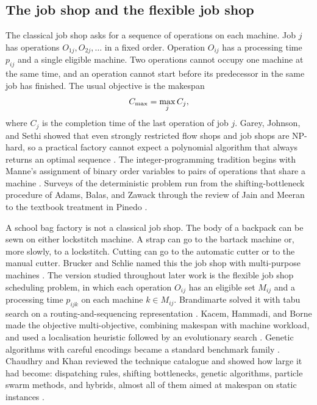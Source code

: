 \subsection{The job shop and the flexible job shop}

The classical job shop asks for a sequence of operations on each machine. Job \(j\) has operations \(O_{1j}, O_{2j}, \ldots\) in a fixed order. Operation \(O_{ij}\) has a processing time \(p_{ij}\) and a single eligible machine. Two operations cannot occupy one machine at the same time, and an operation cannot start before its predecessor in the same job has finished. The usual objective is the makespan
\begin{equation}
C_{\max} = \max_j C_j,
\label{eq:cmax-classic}
\end{equation}
where \(C_j\) is the completion time of the last operation of job \(j\). Garey, Johnson, and Sethi showed that even strongly restricted flow shops and job shops are NP-hard, so a practical factory cannot expect a polynomial algorithm that always returns an optimal sequence \cite{garey1976}. The integer-programming tradition begins with Manne's assignment of binary order variables to pairs of operations that share a machine \cite{manne1960}. Surveys of the deterministic problem run from the shifting-bottleneck procedure of Adams, Balas, and Zawack \cite{adams1988} through the review of Jain and Meeran \cite{jain1999} to the textbook treatment in Pinedo \cite{pinedo2016}.

A school bag factory is not a classical job shop. The body of a backpack can be sewn on either lockstitch machine. A strap can go to the bartack machine or, more slowly, to a lockstitch. Cutting can go to the automatic cutter or to the manual cutter. Brucker and Schlie named this the job shop with multi-purpose machines \cite{brucker1990}. The version studied throughout later work is the flexible job shop scheduling problem, in which each operation \(O_{ij}\) has an eligible set \(M_{ij}\) and a processing time \(p_{ijk}\) on each machine \(k \in M_{ij}\). Brandimarte solved it with tabu search on a routing-and-sequencing representation \cite{brandimarte1993}. Kacem, Hammadi, and Borne made the objective multi-objective, combining makespan with machine workload, and used a localisation heuristic followed by an evolutionary search \cite{kacem2002}. Genetic algorithms with careful encodings became a standard benchmark family \cite{pezzella2008,gao2008,li2016}. Chaudhry and Khan reviewed the technique catalogue and showed how large it had become: dispatching rules, shifting bottlenecks, genetic algorithms, particle swarm methods, and hybrids, almost all of them aimed at makespan on static instances \cite{chaudhry2016}.


